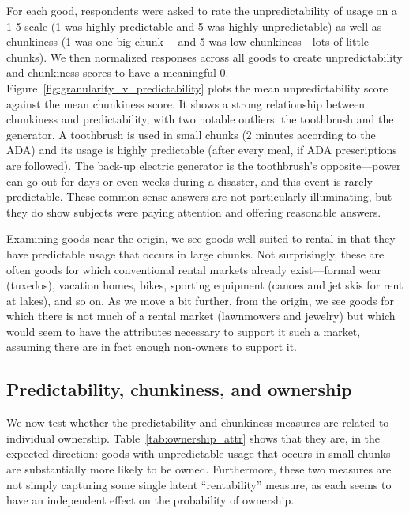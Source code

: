 \documentclass[11pt]{article}
\begin{document}
For each good, respondents were asked to rate the unpredictability of usage on a 1-5 scale (1 was highly predictable and 5 was highly unpredictable) as well as chunkiness (1 was one big chunk--- and 5 was low chunkiness---lots of little chunks).
We then normalized responses across all goods to create unpredictability and chunkiness scores to have a meaningful 0. 
Figure~\ref{fig:granularity_v_predictability} plots the mean unpredictability score against the mean chunkiness score. 
It shows a strong relationship between chunkiness and predictability, with two notable outliers: the toothbrush and the generator. 
A toothbrush is used in small chunks (2 minutes according to the ADA) and its usage is highly predictable (after every meal, if ADA prescriptions are followed).
The back-up electric generator is the toothbrush's opposite---power can go out for days or even weeks during a disaster, and this event is rarely predictable. 
These common-sense answers are not particularly illuminating, but they do show subjects were paying attention and offering reasonable answers. 

Examining goods near the origin, we see goods well suited to rental in that they have predictable usage that occurs in large chunks. 
Not surprisingly, these are often goods for which conventional rental markets already exist---formal wear (tuxedos), vacation homes, bikes, sporting equipment (canoes and jet skis for rent at lakes), and so on.
As we move a bit further, from the origin, we see goods for which there is not much of a rental market (lawnmowers and jewelry) but which would seem to have the attributes necessary to support it such a market, assuming there are in fact enough non-owners to support it.  

\subsection{Predictability, chunkiness, and ownership} 
We now test whether the predictability and chunkiness measures are related to individual ownership. 
Table~\ref{tab:ownership_attr} shows that they are, in the expected direction:
goods with unpredictable usage that occurs in small chunks are substantially more likely to be owned.
Furthermore, these two measures are not simply capturing some single latent ``rentability'' measure, as each seems to have an independent effect on the probability of ownership. 

 
\end{document}

